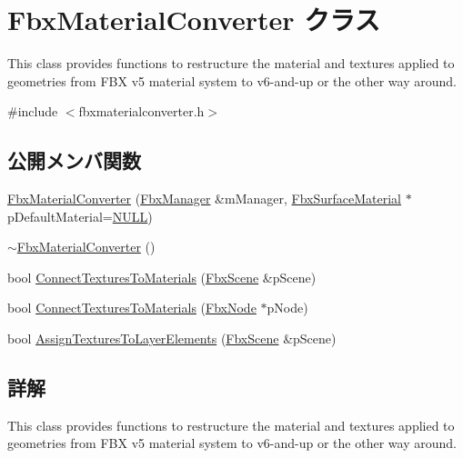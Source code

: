 \hypertarget{class_fbx_material_converter}{}\section{Fbx\+Material\+Converter クラス}
\label{class_fbx_material_converter}


This class provides functions to restructure the material and textures applied to geometries from F\+BX v5 material system to v6-\/and-\/up or the other way around.  




{\ttfamily \#include $<$fbxmaterialconverter.\+h$>$}

\subsection*{公開メンバ関数}
\begin{DoxyCompactItemize}
\item 
\hyperlink{class_fbx_material_converter_a3ad6376fa570214f45f836e4152d088a}{Fbx\+Material\+Converter} (\hyperlink{class_fbx_manager}{Fbx\+Manager} \&m\+Manager, \hyperlink{class_fbx_surface_material}{Fbx\+Surface\+Material} $\ast$p\+Default\+Material=\hyperlink{fbxarch_8h_a070d2ce7b6bb7e5c05602aa8c308d0c4}{N\+U\+LL})
\item 
\hyperlink{class_fbx_material_converter_a3941bfb660ca110cbef7d104e223e7a4}{$\sim$\+Fbx\+Material\+Converter} ()
\item 
bool \hyperlink{class_fbx_material_converter_a46530019d28101c557c8861ed22f2930}{Connect\+Textures\+To\+Materials} (\hyperlink{class_fbx_scene}{Fbx\+Scene} \&p\+Scene)
\item 
bool \hyperlink{class_fbx_material_converter_a7b1b6da882b2dd935a3e008b2a85b132}{Connect\+Textures\+To\+Materials} (\hyperlink{class_fbx_node}{Fbx\+Node} $\ast$p\+Node)
\item 
bool \hyperlink{class_fbx_material_converter_aa25fab49c96d5383012f959ef609c1d5}{Assign\+Textures\+To\+Layer\+Elements} (\hyperlink{class_fbx_scene}{Fbx\+Scene} \&p\+Scene)
\end{DoxyCompactItemize}


\subsection{詳解}
This class provides functions to restructure the material and textures applied to geometries from F\+BX v5 material system to v6-\/and-\/up or the other way around. 

